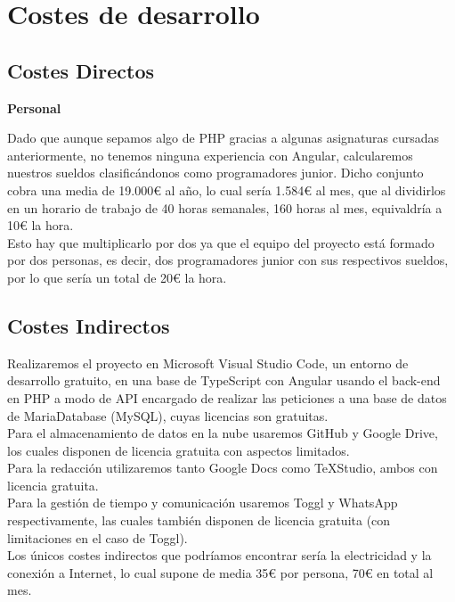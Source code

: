 \section{Costes de desarrollo}
	
\subsection{Costes Directos}	

\textbf{Personal}

Dado que aunque sepamos algo de PHP gracias a algunas asignaturas cursadas anteriormente, no tenemos ninguna experiencia con Angular, calcularemos nuestros sueldos clasificándonos como programadores junior. Dicho conjunto cobra una media de 19.000€ al año, lo cual sería 1.584€ al mes, que al dividirlos en un horario de trabajo de 40 horas semanales, 160 horas al mes, equivaldría a 10€ la hora.\\

Esto hay que multiplicarlo por dos ya que el equipo del proyecto está formado por dos personas, es decir, dos programadores junior con sus respectivos sueldos, por lo que sería un total de 20€ la hora.\\

\subsection{Costes Indirectos}

Realizaremos el proyecto en Microsoft Visual Studio Code, un entorno de desarrollo gratuito, en una base de TypeScript con Angular usando el back-end en PHP a modo de API encargado de realizar las peticiones a una base de datos de MariaDatabase (MySQL), cuyas licencias son gratuitas.\\

Para el almacenamiento de datos en la nube usaremos GitHub y Google Drive, los cuales disponen de licencia gratuita con aspectos limitados.\\

Para la redacción utilizaremos tanto Google Docs como TeXStudio, ambos con licencia gratuita.\\

Para la gestión de tiempo y comunicación usaremos Toggl y WhatsApp respectivamente, las cuales también disponen de licencia gratuita (con limitaciones en el caso de Toggl).\\

Los únicos costes indirectos que podríamos encontrar sería la electricidad y la conexión a Internet, lo cual supone de media 35€ por persona, 70€ en total al mes.\\

